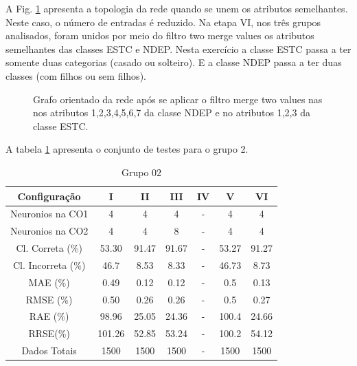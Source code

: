 \documentclass[journal, a4paper]{IEEEtran}
\begin{document}
A Fig. \ref{grafo} apresenta a topologia da rede quando se unem os atributos semelhantes. Neste caso, o número de entradas é reduzido. Na etapa VI, nos três grupos analisados, foram unidos por meio do filtro two merge values os atributos semelhantes das classes ESTC e NDEP. Nesta exercício a classe ESTC passa a ter somente duas categorias (casado ou solteiro). E a classe NDEP passa a ter duas classes (com filhos ou sem filhos). 

\begin{figure}[ht]
	\centering
	\setlength{\fboxsep}{8pt}
	\setlength{\fboxrule}{0.1pt}
	\caption{Grafo orientado da rede após se aplicar o filtro merge two values nas nos atributos 1,2,3,4,5,6,7 da classe NDEP e no atributos 1,2,3 da classe ESTC.}
	\label{grafo}
\end{figure}

A tabela \ref{grupo02} apresenta o conjunto de testes para o grupo 2. 

\begin{table}[ht]
	\begin{center}
		\caption{Grupo $02$}
		\label{grupo02}
		\begin{tabular}{|c|c|c|c|c|c|c|}\hline	
			\textbf{Configuração} &\textbf{I}&\textbf{II}&\textbf{III}&\textbf{IV}&\textbf{V}&\textbf{VI} \\ \hline 
			{Neuronios na CO1} & 4 & 4 & 4 & - & 4 & 4 \\ \hline
			{Neuronios na CO2} & 4 & 4 & 8 & - & 4 & 4 \\ \hline
			{Cl. Correta (\%)} & 53.30 & 91.47 & 91.67  & - & 53.27 &  91.27 \\ \hline
			{Cl. Incorreta (\%)} & 46.7 & 8.53 & 8.33 & - & 46.73 & 8.73 \\ \hline
			{MAE (\%)} & 0.49 &  0.12 & 0.12 & - & 0.5 & 0.13 \\ \hline
			{RMSE (\%)} &0.50 & 0.26 & 0.26 & - & 0.5 & 0.27 \\ \hline
			{RAE (\%)} & 98.96 & 25.05 & 24.36 & - & 100.4 & 24.66 \\ \hline
			{RRSE(\%)} & 101.26 & 52.85 & 53.24 & - & 100.2 & 54.12 \\ \hline
			{Dados Totais} & 1500 & 1500  & 1500 & - & 1500 & 1500 \\ \hline
		\end{tabular}  
	\end{center}
\end{table}
\end{document}
